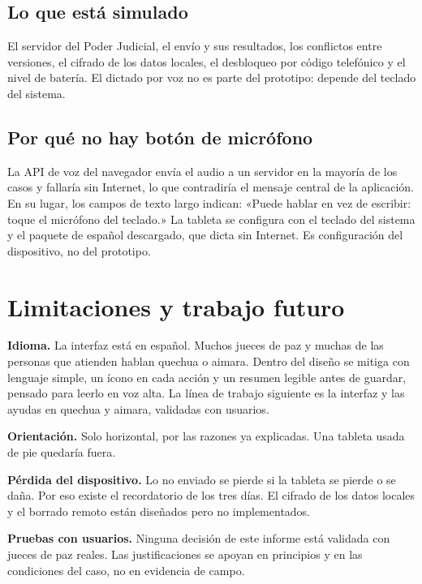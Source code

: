 \documentclass[11pt,a4paper]{article}
\begin{document}
\subsection{Lo que está simulado}

El servidor del Poder Judicial, el envío y sus resultados, los conflictos entre versiones, el cifrado de los datos locales, el desbloqueo por código telefónico y el nivel de batería. El dictado por voz no es parte del prototipo: depende del teclado del sistema.

\subsection{Por qué no hay botón de micrófono}

La API de voz del navegador envía el audio a un servidor en la mayoría de los casos y fallaría sin Internet, lo que contradiría el mensaje central de la aplicación. En su lugar, los campos de texto largo indican: «Puede hablar en vez de escribir: toque el micrófono del teclado.» La tableta se configura con el teclado del sistema y el paquete de español descargado, que dicta sin Internet. Es configuración del dispositivo, no del prototipo.

\section{Limitaciones y trabajo futuro}

\textbf{Idioma.} La interfaz está en español. Muchos jueces de paz y muchas de las personas que atienden hablan quechua o aimara. Dentro del diseño se mitiga con lenguaje simple, un ícono en cada acción y un resumen legible antes de guardar, pensado para leerlo en voz alta. La línea de trabajo siguiente es la interfaz y las ayudas en quechua y aimara, validadas con usuarios.

\textbf{Orientación.} Solo horizontal, por las razones ya explicadas. Una tableta usada de pie quedaría fuera.

\textbf{Pérdida del dispositivo.} Lo no enviado se pierde si la tableta se pierde o se daña. Por eso existe el recordatorio de los tres días. El cifrado de los datos locales y el borrado remoto están diseñados pero no implementados.

\textbf{Pruebas con usuarios.} Ninguna decisión de este informe está validada con jueces de paz reales. Las justificaciones se apoyan en principios y en las condiciones del caso, no en evidencia de campo.
\end{document}
